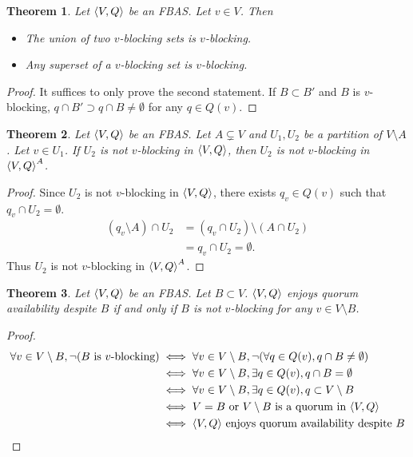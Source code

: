 \documentclass[12pt, psamsfonts]{amsart}
\newtheorem{thm}{Theorem}[subsection]
\theoremstyle{definition}
\theoremstyle{remark}
\numberwithin{equation}{subsection}
\begin{document}
\begin{thm}\label{basic_prop_v_blocking}
    Let $\ev{V, Q}$ be an FBAS\@.
    Let $v \in V$.
    Then
    \begin{itemize}
        \item
            The union of two $v$-blocking sets is $v$-blocking.
        \item
            Any superset of a $v$-blocking set is $v$-blocking.
    \end{itemize}
\end{thm}

\begin{proof}
    It suffices to only prove the second statement.
    If $B \subset B'$ and $B$ is $v$-blocking, $q \cap B' \supset q \cap B \ne \emptyset$ for any $q \in Q(v)$.
\end{proof}

\begin{thm}\label{v_blocking_delete}
    Let $\ev{V, Q}$ be an FBAS\@.
    Let $A \subsetneq V$ and $U_1, U_2$ be a partition of $V \setminus A$.
    Let $v \in U_1$.
    If $U_2$ is not $v$-blocking in $\ev{V, Q}$, then $U_2$ is not $v$-blocking in $\ev{V, Q}^A$.
\end{thm}

\begin{proof}
    Since $U_2$ is not $v$-blocking in $\ev{V, Q}$, there exists $q_v \in Q(v)$ such that $q_v \cap U_2 = \emptyset$.
    \begin{align*}
        (q_v \setminus A) \cap U_2
            &= (q_v \cap U_2) \setminus (A \cap U_2) \\
            &= q_v \cap U_2 = \emptyset.
    \end{align*}
    Thus $U_2$ is not $v$-blocking in $\ev{V, Q}^A$.
\end{proof}

\begin{thm}\label{quorum_availability_v_blocking}
    Let $\ev{V, Q}$ be an FBAS\@.
    Let $B \subset V$.
    $\ev{V, Q}$ enjoys quorum availability despite $B$ if and only if $B$ is not $v$-blocking for any $v \in V \setminus B$.
\end{thm}

\begin{proof}
    \begin{align*}
        \forall v \in V \setminus B, \neg(\text{$B$ is $v$-blocking})
            &\iff \forall v \in V \setminus B, \neg(\forall q \in Q(v), q \cap B \ne \emptyset) \\
            &\iff \forall v \in V \setminus B, \exists q \in Q(v), q \cap B = \emptyset \\
            &\iff \forall v \in V \setminus B, \exists q \in Q(v), q \subset V \setminus B \\
            &\iff \text{$V = B$ or $V \setminus B$ is a quorum in $\ev{V, Q}$} \\
            &\iff \text{$\ev{V, Q}$ enjoys quorum availability despite $B$}
    \end{align*}
\end{proof}
\end{document}
